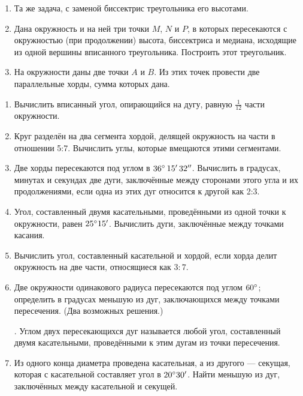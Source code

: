 \begin{enumerate}[resume]
\item
Та же задача, с заменой биссектрис треугольника его высотами.

\item
Дана окружность и на ней три точки $M$, $N$ и $P$, в которых пересекаются с окружностью (при продолжении) высота, биссектриса и медиана, исходящие из одной вершины вписанного треугольника.
Построить этот треугольник.

\item
На окружности даны две точки $A$ и $B$.
Из этих точек провести две параллельные хорды, сумма которых дана.

\end{enumerate}

\begin{center}
\end{center}

\begin{enumerate}[resume]

\item
Вычислить вписанный угол, опирающийся на дугу, равную $\tfrac1{12}$ части окружности.

\item
Круг разделён на два сегмента хордой, делящей окружность на части в отношении 5:7.
Вычислить углы, которые вмещаются этими сегментами.

\item
Две хорды пересекаются под углом в $36\degree\, 15'\, 32''$.
Вычислить в градусах, минутах и секундах две дуги, заключённые между сторонами этого угла и их продолжениями, если одна из этих дуг относится к другой как 2:3.

\item
Угол, составленный двумя касательными, проведёнными из одной точки к окружности, равен $25\degree15'$.
Вычислить дуги, заключённые между точками касания.

\item
Вычислить угол, составленный касательной и хордой, если хорда делит окружность на две части, относящиеся как $3:7$.

\item
Две окружности одинакового радиуса пересекаются под углом $60\degree$;
определить в градусах меньшую из дуг, заключающихся между точками пересечения. (Два возможных решения.)

\smallskip
{}.
Углом двух пересекающихся дуг называется любой угол, составленный двумя касательными, проведёнными к этим дугам из точки пересечения.

\item
Из одного конца диаметра проведена касательная, а из другого — секущая, которая с касательной составляет угол в $20\degree 30'$.
Найти меньшую из дуг, заключённых между касательной и секущей.

\end{enumerate}
